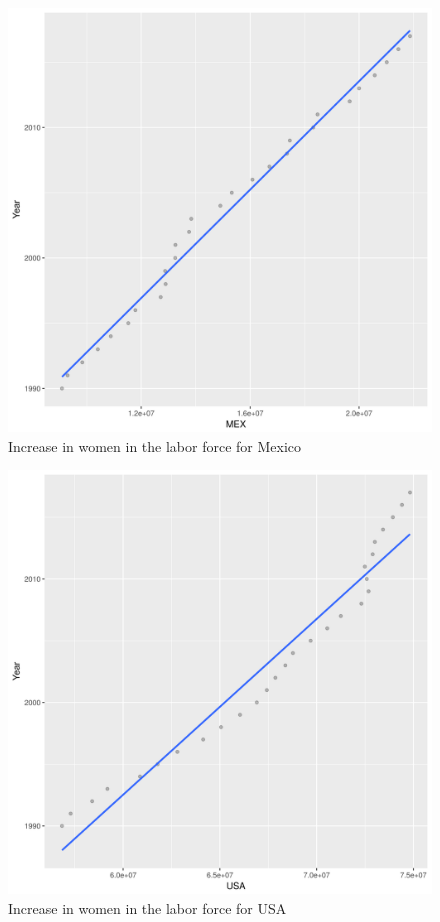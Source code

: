 \documentclass[12pt]{article}
\begin{document}
\begin{figure}[h!]
\caption{Increase in women in the labor force for Mexico }
\centering
\includegraphics[scale=.5]{quest3Mexico.png}
\end{figure}

\clearpage

\begin{figure}[h!]
\caption{Increase in women in the labor force for USA }
\centering
\includegraphics[scale=.5]{quest3USA.png}
\end{figure}
\clearpage
\end{document}
